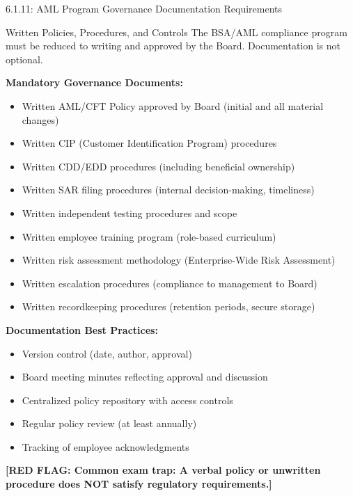 \documentclass[11pt,a4paper]{beamer}
\newcommand{\redflag}[1]{\textcolor{red!80!black}{\textbf{[RED FLAG: #1]}}}
\begin{document}

\begin{frame}{6.1.11: AML Program Governance Documentation Requirements}
	\begin{block}{Written Policies, Procedures, and Controls}
		The BSA/AML compliance program must be reduced to writing and approved by the Board. Documentation is not optional.
	\end{block}
	\textbf{Mandatory Governance Documents:}
	\begin{itemize}
		\item Written AML/CFT Policy approved by Board (initial and all material changes)
		\item Written CIP (Customer Identification Program) procedures
		\item Written CDD/EDD procedures (including beneficial ownership)
		\item Written SAR filing procedures (internal decision-making, timeliness)
		\item Written independent testing procedures and scope
		\item Written employee training program (role-based curriculum)
		\item Written risk assessment methodology (Enterprise-Wide Risk Assessment)
		\item Written escalation procedures (compliance to management to Board)
		\item Written recordkeeping procedures (retention periods, secure storage)
	\end{itemize}
	\textbf{Documentation Best Practices:}
	\begin{itemize}
		\item Version control (date, author, approval)
		\item Board meeting minutes reflecting approval and discussion
		\item Centralized policy repository with access controls
		\item Regular policy review (at least annually)
		\item Tracking of employee acknowledgments
	\end{itemize}
	\redflag{Common exam trap: A verbal policy or unwritten procedure does NOT satisfy regulatory requirements.}
\end{frame}
\end{document}
